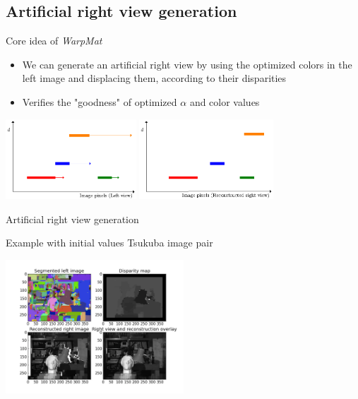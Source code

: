 \documentclass[12pt]{beamer}
\begin{document}
\subsection{Artificial right view generation}
\begin{frame}
  \begin{block}{Core idea of \emph{WarpMat}}
    \begin{itemize}
      \item We can generate an artificial right view by using the optimized colors in the left image and displacing them, according to their disparities
      \item Verifies the "goodness" of optimized $\alpha$ and color values
    \end{itemize}
  \end{block}

  \begin{center}
    \includegraphics[height=3cm]{graphics/warpmat-artificialright-1.eps}
    \includegraphics[height=3cm]{graphics/warpmat-artificialright-2.eps}
  \end{center}
\end{frame}

\begin{frame}{Artificial right view generation}
  \begin{block}{Example with initial values}
    Tsukuba image pair
  \end{block}
  \begin{center}
    \includegraphics[height=5cm]{../images/All-WarpMat.png}
  \end{center}
\end{frame}
\end{document}
